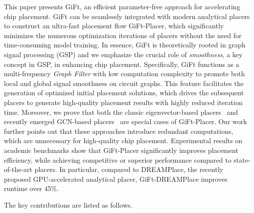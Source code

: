 This paper presents GiFt, an efficient parameter-free approach for accelerating chip placement. GiFt can be seamlessly integrated with modern analytical placers to construct an ultra-fast placement flow GiFt-Placer, which significantly minimizes the numerous optimization iterations of placers without the need for time-consuming model training.
In essence, GiFt is theoretically rooted in graph signal processing (GSP) and we emphasize the crucial role of \emph{smoothness}, a key concept in GSP, in enhancing chip placement. Specifically, GiFt functions as a multi-frequency \emph{Graph Filter} with low computation complexity to promote both local and global signal smoothness on circuit graphs. This feature facilitates the generation of optimized initial placement solutions, which drives the subsequent placers to generate high-quality placement results with highly reduced iteration time.
Moreover, we prove that both the classic eigenvector-based placers~\cite{eigen_placer, eigen_placer2} and recently emerged GCN-based placers~\cite{graphplanner, CY2021} are special cases of GiFt-Placer. Our work further points out that these approaches introduce redundant computations, which are unnecessary for high-quality chip placement. Experimental results on academic benchmarks show that GiFt-Placer significantly improves placement efficiency, while achieving competitive or superior performance compared to state-of-the-art placers. In particular, compared to DREAMPlace, the recently proposed GPU-accelerated analytical placer, GiFt-DREAMPlace improves runtime over 45\%.

The key contributions are listed as follows.


